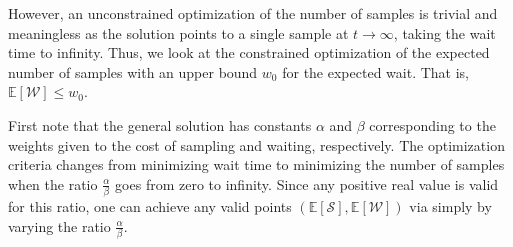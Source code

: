 However, an unconstrained optimization of the number of samples is trivial and meaningless as the solution points to a single sample at $t\!\rightarrow\!\infty$, taking the wait time to infinity.
Thus, we look at the constrained optimization of the expected number of samples with an upper bound $w_0$ for the expected wait.
That is, $\mathbb{E}[\mathcal{W}]\!\leq\!w_0$.

First note that the general solution has constants $\alpha$ and $\beta$ corresponding to the weights given to the cost of sampling and waiting, respectively.
The optimization criteria changes from minimizing wait time to minimizing the number of samples when the ratio $\frac{\alpha}{\beta}$ goes from zero to infinity.
Since any positive real value is valid for this ratio, one can achieve any valid points $(\mathbb{E}[\mathcal{S}],\mathbb{E}[\mathcal{W}])$ via simply by varying the ratio $\frac{\alpha}{\beta}$.


